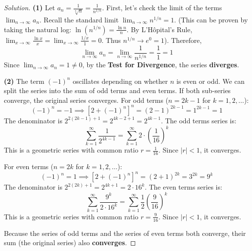 \documentclass[11pt]{article}
\theoremstyle{definition}
\newenvironment{solution}{\begin{proof}[Solution]}{\end{proof}}
\begin{document}
\begin{solution}
\textbf{(1)} Let $a_n = \frac{1}{\sqrt[n]{n}} = \frac{1}{n^{1/n}}$.
First, let's check the limit of the terms $\lim_{n \to \infty} a_n$.
Recall the standard limit $\lim_{n \to \infty} n^{1/n} = 1$. (This can be proven by taking the natural log: $\ln(n^{1/n}) = \frac{\ln n}{n}$. By L'Hôpital's Rule, $\lim_{x \to \infty} \frac{\ln x}{x} = \lim_{x \to \infty} \frac{1/x}{1} = 0$. Thus $n^{1/n} \to e^0 = 1$).
Therefore,
\[
\lim_{n \to \infty} a_n = \lim_{n \to \infty} \frac{1}{n^{1/n}} = \frac{1}{1} = 1
\]
Since $\lim_{n \to \infty} a_n = 1 \neq 0$, by the \textbf{Test for Divergence}, the series \textbf{diverges}.

\textbf{(2)} The term $(-1)^n$ oscillates depending on whether $n$ is even or odd. We can split the series into the sum of odd terms and even terms. If both sub-series converge, the original series converges.
For odd terms ($n = 2k-1$ for $k=1, 2, \dots$):
\[
(-1)^n = -1 \implies [2+(-1)^n]^n = (2-1)^{2k-1} = 1^{2k-1} = 1
\]
The denominator is $2^{2(2k-1)+1} = 2^{4k-2+1} = 2^{4k-1}$.
The odd terms series is:
\[
\sum_{k=1}^{\infty} \frac{1}{2^{4k-1}} = \sum_{k=1}^{\infty} 2 \cdot \left(\frac{1}{16}\right)^k
\]
This is a geometric series with common ratio $r = \frac{1}{16}$. Since $|r| < 1$, it converges.

For even terms ($n = 2k$ for $k=1, 2, \dots$):
\[
(-1)^n = 1 \implies [2+(-1)^n]^n = (2+1)^{2k} = 3^{2k} = 9^k
\]
The denominator is $2^{2(2k)+1} = 2^{4k+1} = 2 \cdot 16^k$.
The even terms series is:
\[
\sum_{k=1}^{\infty} \frac{9^k}{2 \cdot 16^k} = \sum_{k=1}^{\infty} \frac{1}{2} \left(\frac{9}{16}\right)^k
\]
This is a geometric series with common ratio $r = \frac{9}{16}$. Since $|r| < 1$, it converges.

Because the series of odd terms and the series of even terms both converge, their sum (the original series) also \textbf{converges}.


\end{solution}
\end{document}
